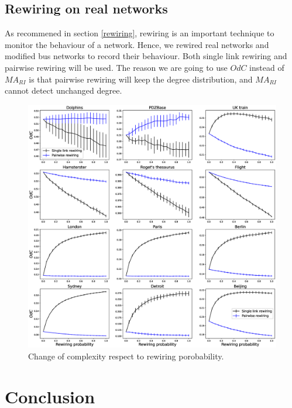 \documentclass[12pt]{article}
\begin{document}
\subsection{Rewiring on real networks}
As recommened in section \ref{rewiring}, rewiring is an important technique to monitor the behaviour of a network. Hence, we rewired real networks and modified bus networks to record their behaviour. Both single link rewiring and pairwise rewiring will be used. The reason we are going to use $OdC$ instead of $MA_{RI}$ is that pairwise rewiring will keep the degree distribution, and $MA_{RI}$ cannot detect unchanged degree.
\begin{figure}[ht]
    \centering
    \includegraphics[width=\textwidth]{rewiring.eps}
    \caption{Change of complexity respect to rewiring porobability.}
\end{figure}


\clearpage
\section{Conclusion}

\printbibliography
\end{document}
